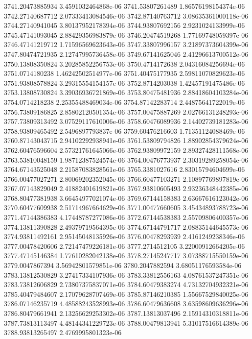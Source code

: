 {3741.20473885934 3.4591032464868e-06
3741.53807261489 1.86576198154374e-06
3742.27140687712 2.07333413084546e-06
3742.87140763712 3.08635361000118e-06
3744.27140941045 3.80137952178394e-06
3744.93807692156 2.9231024133999e-06
3745.47141093045 2.88429356983879e-06
3746.20474519268 1.77169748059397e-06
3746.47141219712 1.71596569623643e-06
3747.33807996157 3.21897373604399e-06
3747.80474721935 2.12747995736458e-06
3749.67141625046 2.41296613700512e-06
3750.13808350824 3.20285852256753e-06
3750.4714172638 2.04316084256694e-06
3751.0714180238 1.46242502514977e-06
3751.40475177935 2.59811070829623e-06
3751.93808578824 3.29315554154157e-06
3752.8714203038 1.42457191475486e-06
3753.13808730824 3.39036936721869e-06
3753.80475481936 2.88418604103284e-06
3754.0714218238 2.25355488469034e-06
3754.87142283714 2.44875641722019e-06
3756.73809186825 2.85802120501354e-06
3757.00475887269 2.02766131248293e-06
3757.73809313492 3.07529117610006e-06
3758.60476089936 2.14402739181283e-06
3758.93809465492 2.5496897793837e-06
3759.60476216603 1.71351124088469e-06
3760.87143043715 2.94102292938941e-06
3761.53809794826 1.88902854379624e-06
3762.60476596604 2.57321761645066e-06
3762.93809972159 2.89327428111568e-06
3763.53810048159 1.98712387524574e-06
3764.00476773937 2.30319289258054e-06
3764.67143525048 2.21587083828561e-06
3765.3381027616 2.83015794604699e-06
3766.00477027271 2.80069202352045e-06
3766.60477103271 2.10897769897819e-06
3767.07143829049 2.41882401619821e-06
3767.93810605493 2.93236348442385e-06
3768.80477381938 3.66454977021074e-06
3769.67144158383 2.63667616123042e-06
3770.60477609938 2.51714967664629e-06
3771.00477660605 3.45434893788723e-06
3771.47144386383 4.17448787277086e-06
3772.67144538383 2.55709806400357e-06
3774.13811390828 2.49379719564395e-06
3774.67144791717 2.08835144645573e-06
3774.93811492161 2.95145048135926e-06
3776.00478293939 2.4161249238346e-06
3777.00478420606 2.72147479226181e-06
3777.2714512105 3.22000912664205e-06
3777.47145146384 1.77610282042138e-06
3778.27145247717 3.07388715550159e-06
3779.0047867394 3.56942801579851e-06
3780.2047882594 3.68051176593584e-06
3783.13812530829 3.27417334107936e-06
3783.33812556163 4.08761537247351e-06
3783.73812606829 2.73807375837071e-06
3784.60479383274 4.73132704932321e-06
3785.40479484607 2.17079628707469e-06
3785.87146210385 1.55667529840025e-06
3786.07146235719 4.48588243528993e-06
3786.60479636608 3.63598609636296e-06
3786.80479661941 2.13256629253302e-06
3787.13813037496 2.15914310318811e-06
3787.73813113497 4.48144341229723e-06
3788.00479813941 5.31017516614389e-06
3788.93813265497 2.4769995801323e-06
}
